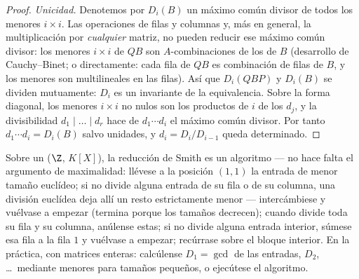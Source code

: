 \begin{proof}
\emph{Unicidad.} Denotemos por $D_i(B)$ un máximo común divisor de todos
los menores $i \times i$. Las operaciones de filas y columnas y, más en
general, la multiplicación por \emph{cualquier} matriz, no pueden
reducir ese máximo común divisor: los menores $i \times i$ de $QB$ son
$A$-combinaciones de los de $B$ (desarrollo de Cauchy--Binet; o
directamente: cada fila de $QB$ es combinación de filas de $B$, y los
menores son multilineales en las filas). Así que $D_i(QBP)$ y $D_i(B)$
se dividen mutuamente: $D_i$ es un invariante de la equivalencia. Sobre
la forma diagonal, los menores $i
\times i$ no nulos son los productos de $i$ de los $d_j$, y la
divisibilidad $d_1 \mid \dots \mid d_r$ hace de $d_1 \cdots d_i$ el
máximo común divisor. Por tanto $d_1 \cdots d_i = D_i(B)$ salvo
unidades, y $d_i =
D_i/D_{i-1}$ queda determinado.
\end{proof}

\begin{method}\label{met:b3:modules:smith}
Sobre un  ($\Z$, $K[X]$),
la reducción de Smith es un algoritmo --- no hace falta el argumento de
maximalidad: llévese a la posición $(1,1)$ la entrada de menor tamaño
euclídeo; si no divide alguna entrada de su fila o de su columna, una
división euclídea deja allí un resto estrictamente menor ---
intercámbiese y vuélvase a empezar (termina porque los tamaños
decrecen); cuando divide toda su fila y su columna, anúlense estas; si
no divide alguna entrada interior, súmese esa fila a la fila $1$ y
vuélvase a empezar; recúrrase sobre el bloque interior. En la práctica,
con matrices enteras: calcúlense $D_1 = \gcd$ de las entradas, $D_2$,
\dots\ mediante menores para tamaños pequeños, o ejecútese el algoritmo.
\end{method}

